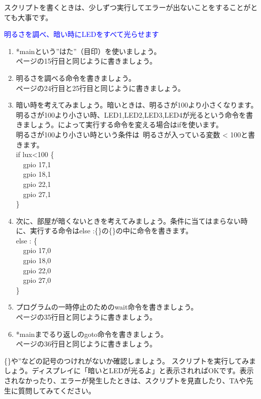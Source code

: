 \begin{enumerate}
\begin{enumerate}
スクリプトを書くときは、少しずつ実行してエラーが出ないことをすることがとても大事です。
\end{enumerate}
\textcolor{blue}{\item 明るさを調べ、暗い時にLEDをすべて光らせます}
\begin{enumerate}
\item *mainという”はた”（目印）を使いましょう。\\
\pageref{sensors.hsp}ページの15行目と同じように書きましょう。
\item 明るさを調べる命令を書きましょう。\\
\pageref{sensors.hsp}ページの24行目と25行目と同じように書きましょう。
\item 暗い時を考えてみましょう。暗いときは、明るさが100より小さくなります。
明るさが100より小さい時、LED1,LED2,LED3,LED4が光るという命令を書きましょう。によって実行する命令を変える場合はifを使います。\\
明るさが100より小さい時という条件は\ 明るさが入っている変数 < 100と書きます。\\
if lux<100 \{\\
\ \ gpio 17,1\\
\ \ gpio 18,1\\
\ \ gpio 22,1\\
\ \ gpio 27,1\\
\}
\item 次に、部屋が暗くないときを考えてみましょう。条件に当てはまらない時に、実行する命令はelse :\{\}の\{\}の中に命令を書きます。\\
else : \{\\
\ \ gpio 17,0\\
\ \ gpio 18,0\\
\ \ gpio 22,0\\
\ \ gpio 27,0\\
\}
\item プログラムの一時停止のためのwait命令を書きましょう。\\
\pageref{sensors.hsp}ページの35行目と同じように書きましょう。
\item *mainまでるり返しのgoto命令を書きましょう。\\
\pageref{sensors.hsp}ページの36行目と同じように書きましょう。
\end{enumerate}
\item  \{\}や”などの記号のつけれがないか確認しましょう。
スクリプトを実行してみましょう。ディスプレイに「暗いとLEDが光るよ」と表示されればOKです。表示されなかったり、エラーが発生したときは、スクリプトを見直したり、TAや先生に質問してみてください。
\end{enumerate}

\begin{tcolorbox}[title=\useOmetoi]
    \begin{enumerate}
    \end{enumerate}
\end{tcolorbox}

